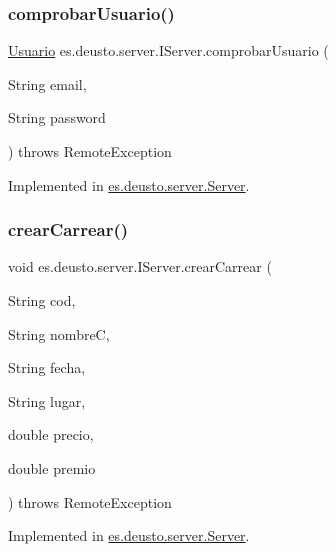 \subsubsection{\texorpdfstring{comprobarUsuario()}{comprobarUsuario()}}
{\footnotesize\ttfamily \mbox{\hyperlink{classes_1_1deusto_1_1server_1_1jdo_1_1_usuario}{Usuario}} es.\+deusto.\+server.\+I\+Server.\+comprobar\+Usuario (\begin{DoxyParamCaption}\item[{String}]{email,  }\item[{String}]{password }\end{DoxyParamCaption}) throws Remote\+Exception}



Implemented in \mbox{\hyperlink{classes_1_1deusto_1_1server_1_1_server_afa3e758715cbf321f9c1cbe08a8583a4}{es.\+deusto.\+server.\+Server}}.

\mbox{\label{interfacees_1_1deusto_1_1server_1_1_i_server_a3cb0049dde89f2d81fcc883b19a0c6cf}} 
\subsubsection{\texorpdfstring{crearCarrear()}{crearCarrear()}}
{\footnotesize\ttfamily void es.\+deusto.\+server.\+I\+Server.\+crear\+Carrear (\begin{DoxyParamCaption}\item[{String}]{cod,  }\item[{String}]{nombreC,  }\item[{String}]{fecha,  }\item[{String}]{lugar,  }\item[{double}]{precio,  }\item[{double}]{premio }\end{DoxyParamCaption}) throws Remote\+Exception}



Implemented in \mbox{\hyperlink{classes_1_1deusto_1_1server_1_1_server_a22d31cd9642f978f1995fc7822d99258}{es.\+deusto.\+server.\+Server}}.

\mbox{\label{interfacees_1_1deusto_1_1server_1_1_i_server_ab6f6b6b646a79a330ab0b2174d77db44}} 
